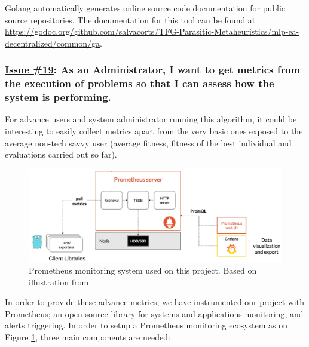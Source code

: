 Golang automatically generates online source code documentation for public source repositories. The documentation for this tool can be found at \href{godoc.org/github.com/salvacorts/TFG-Parasitic-Metaheuristics/mlp-ea-decentralized/common/ga}{https://godoc.org/github.com/salvacorts/TFG-Parasitic-Metaheuristics/mlp-ea-decentralized/common/ga}.


\subsubsection*{\href{https://github.com/salvacorts/TFG-Parasitic-Metaheuristics/issues/19}{Issue \#19}: As an Administrator, I want to get metrics from the execution of problems so that I can assess how the system is performing.}

For advance users and system administrator running this algorithm, it could be interesting to easily collect metrics apart from the very basic ones exposed to the average non-tech savvy user (average fitness, fitness of the best individual and evaluations carried out so far).

\begin{figure}[h!]
		\centering
    	\includegraphics[width=\linewidth]{assets/images/prometheus-architecture.png}
    	\caption{Prometheus monitoring system used on this project. Based on illustration from \cite{prom-image}}
    	\label{fig:prometheus-ecosystem}
\end{figure}

In order to provide these advance metrics, we have instrumented our project with Prometheus\cite{prometheus}; an open source library for systems and applications monitoring, and alerts triggering. In order to setup a Prometheus monitoring ecosystem as on Figure \ref{fig:prometheus-ecosystem}, three main components are needed:

